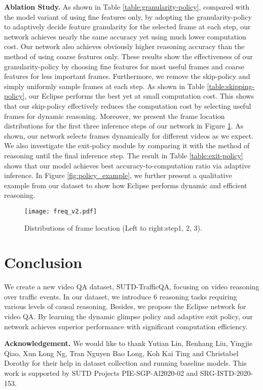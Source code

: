 \documentclass[final]{cvpr}
\begin{document}
{\bf Ablation Study.} As shown in Table \ref{table:granularity-policy}, compared with the model variant of using fine features only, by adopting the granularity-policy to adaptively decide feature granularity for the selected frame at each step, our network achieves nearly the same accuracy yet using much lower computation cost. 
Our network also achieves obviously higher reasoning accuracy than the method of using coarse features only. These results show the effectiveness of our granularity-policy by choosing fine features for most useful frames and coarse features for less important frames. 
Furthermore, we remove the skip-policy and simply uniformly sample frames at each step. 
As shown in Table \ref{table:skipping-policy}, our Eclipse performs the best yet at small computation cost. 
This shows that our skip-policy effectively reduces the computation cost by selecting useful frames for dynamic reasoning.
Moreover, we present the frame location distributions for the first three inference steps of our network in Figure \ref{fig:Freq}. 
As shown, our network selects frames dynamically for different videos as we expect. 
We also investigate the exit-policy module by comparing it with the method of reasoning until the final inference step. The result in Table \ref{table:exit-policy} shows that our model achieves best accuracy-to-computation ratio via adaptive inference. In Figure \ref{fig:policy_example}, we further present a qualitative example from our dataset to show how Eclipse performs dynamic and efficient reasoning. 


\begin{figure}[htbp]
\vspace{-0.3cm}
\begin{center}
   \texttt{[image: freq\_v2.pdf]}
\end{center}
\vspace{-0.4cm}
   \caption{Distributions of frame location (Left to right:step1, 2, 3).}
\label{fig:Freq}
\vspace{-0.4cm}
\end{figure}



\section{Conclusion}
We create a new video QA dataset, SUTD-TrafficQA, focusing on video reasoning over traffic events. In our dataset, we introduce 6 reasoning tasks requiring various levels of causal reasoning. Besides, we propose the Eclipse network for video QA. By learning the dynamic glimpse policy and adaptive exit policy, our network achieves superior performance with significant computation efficiency.

{\bf Acknowledgement.} We would like to thank Yutian Lin, Renhang Liu, Yingjie Qiao, Xun Long Ng, Tran Nguyen Bao Long, Koh Kai Ting and Christabel Dorothy for their help in dataset collection and running baseline models. This work is supported by SUTD Projects PIE-SGP-Al2020-02 and SRG-ISTD-2020-153.

{\small


}
\end{document}

